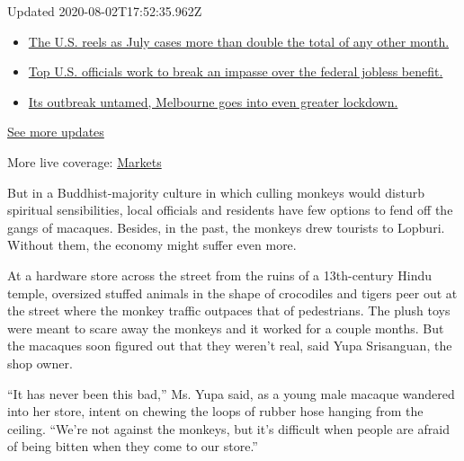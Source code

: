 Updated 2020-08-02T17:52:35.962Z

\begin{itemize}
\tightlist
\item
  \href{https://www.nytimes3xbfgragh.onion/2020/08/01/world/coronavirus-covid-19.html?action=click\&pgtype=Article\&state=default\&region=MAIN_CONTENT_1\&context=storylines_live_updates\#link-34047410}{The
  U.S. reels as July cases more than double the total of any other
  month.}
\item
  \href{https://www.nytimes3xbfgragh.onion/2020/08/01/world/coronavirus-covid-19.html?action=click\&pgtype=Article\&state=default\&region=MAIN_CONTENT_1\&context=storylines_live_updates\#link-780ec966}{Top
  U.S. officials work to break an impasse over the federal jobless
  benefit.}
\item
  \href{https://www.nytimes3xbfgragh.onion/2020/08/01/world/coronavirus-covid-19.html?action=click\&pgtype=Article\&state=default\&region=MAIN_CONTENT_1\&context=storylines_live_updates\#link-2bc8948}{Its
  outbreak untamed, Melbourne goes into even greater lockdown.}
\end{itemize}

\href{https://www.nytimes3xbfgragh.onion/2020/08/01/world/coronavirus-covid-19.html?action=click\&pgtype=Article\&state=default\&region=MAIN_CONTENT_1\&context=storylines_live_updates}{See
more updates}

More live coverage:
\href{https://www.nytimes3xbfgragh.onion/live/2020/07/31/business/stock-market-today-coronavirus?action=click\&pgtype=Article\&state=default\&region=MAIN_CONTENT_1\&context=storylines_live_updates}{Markets}

But in a Buddhist-majority culture in which culling monkeys would
disturb spiritual sensibilities, local officials and residents have few
options to fend off the gangs of macaques. Besides, in the past, the
monkeys drew tourists to Lopburi. Without them, the economy might suffer
even more.

At a hardware store across the street from the ruins of a 13th-century
Hindu temple, oversized stuffed animals in the shape of crocodiles and
tigers peer out at the street where the monkey traffic outpaces that of
pedestrians. The plush toys were meant to scare away the monkeys and it
worked for a couple months. But the macaques soon figured out that they
weren't real, said Yupa Srisanguan, the shop owner.

``It has never been this bad,'' Ms. Yupa said, as a young male macaque
wandered into her store, intent on chewing the loops of rubber hose
hanging from the ceiling. ``We're not against the monkeys, but it's
difficult when people are afraid of being bitten when they come to our
store.''

